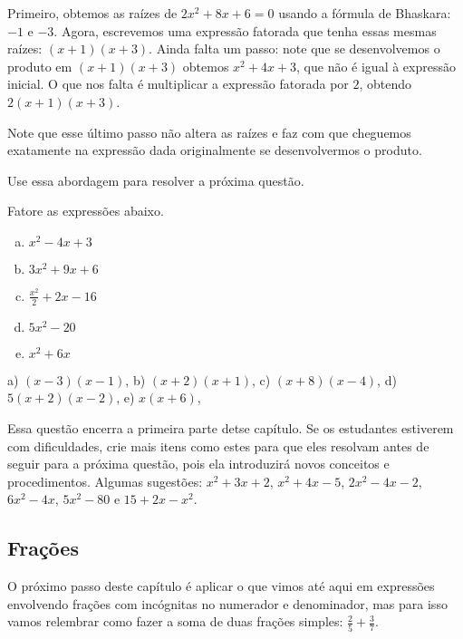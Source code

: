 \documentclass[main_estudante.tex]{subfiles}
\begin{document}
Primeiro, obtemos as raízes de $2x^2+8x+6=0$ usando a fórmula de Bhaskara: $-1$ e $-3$. Agora, escrevemos uma expressão fatorada que tenha essas mesmas raízes: $(x+1)(x+3)$. Ainda falta um passo: note que se desenvolvemos o produto em $(x+1)(x+3)$ obtemos $x^2+4x+3$, que não é igual à expressão inicial. O que nos falta é multiplicar a expressão fatorada por $2$, obtendo $2(x+1)(x+3)$.

Note que esse último passo não altera as raízes e faz com que cheguemos exatamente na expressão dada originalmente se desenvolvermos o produto.

Use essa abordagem para resolver a próxima questão.

\begin{questao}
Fatore as expressões abaixo.
\begin{enumerate}[a)]
\item $x^2-4x+3$
\item $3x^2+9x+6$
\item $\frac{x^2}{2}+2x-16$
\item $5x^2-20$
\item $x^2+6x$
\end{enumerate}
\end{questao}

\begin{gabarito}
	\begin{gabaritoQuestao}
		a) $(x-3)(x-1)$, b) $(x+2)(x+1)$, c) $(x+8)(x-4)$, d) $5(x+2)(x-2)$, e) $x(x+6)$,
	\end{gabaritoQuestao}
\end{gabarito}

\paraTutores

Essa questão encerra a primeira parte detse capítulo. Se os estudantes estiverem com dificuldades, crie mais itens como estes para que eles resolvam antes de seguir para a próxima questão, pois ela introduzirá novos conceitos e procedimentos. Algumas sugestões: $x^2+3x+2$, $x^2+4x-5$, $2x^2-4x-2$, $6x^2-4x$, $5x^2-80$ e $15+2x-x^2$.

\paraAmbos

\subsection*{Frações}

O próximo passo deste capítulo é aplicar o que vimos até aqui em expressões envolvendo frações com incógnitas no numerador e denominador, mas para isso vamos relembrar como fazer a soma de duas frações simples: $\frac{2}{5}+\frac{3}{7}$.
\end{document}
